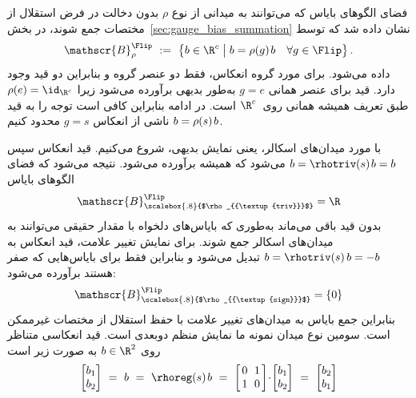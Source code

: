 فضای الگوهای بایاس که می‌توانند به میدانی از نوع $\rho$ بدون دخالت در فرض استقلال از مختصات جمع شوند، در بخش~\ref{sec:gauge_bias_summation} نشان داده شد که توسط
\begin{align}
	\mathscr{B}^{\Flip}_\rho\ :=\ \big\{ b \in\R^c \;\big|\; b = \rho(g)\mkern2mu b\ \ \ \forall g\in \Flip \big\} \,.
\end{align}
داده می‌شود.
برای مورد گروه انعکاس، فقط دو عنصر گروه و بنابراین دو قید وجود دارد.
قید برای عنصر همانی $g=e$ به‌طور بدیهی برآورده می‌شود زیرا $\rho(e) = \id_{\R^c}$ طبق تعریف همیشه همانی روی~$\R^c$ است.
در ادامه بنابراین کافی است توجه را به قید $b = \rho(s)\mkern2mu b$ ناشی از انعکاس $g=s$ محدود کنیم.

با مورد میدان‌های اسکالر، یعنی نمایش بدیهی، شروع می‌کنیم.
قید انعکاس سپس $b = \rhotriv(s)\mkern2mu b = b$ می‌شود که همیشه برآورده می‌شود.
نتیجه می‌شود که فضای الگوهای بایاس
\begin{align}
	\mathscr{B}^{\Flip}_{\scalebox{.8}{$\rho_{{\textup{triv}}}$}} = \R
\end{align}
بدون قید باقی می‌ماند به‌طوری که بایاس‌های دلخواه با مقدار حقیقی می‌توانند به میدان‌های اسکالر جمع شوند.
برای نمایش تغییر علامت، قید انعکاس به $b = \rhotriv(s)\, b = -b$ تبدیل می‌شود و بنابراین فقط برای بایاس‌هایی که صفر هستند برآورده می‌شود:
\begin{align}
	\mathscr{B}^{\Flip}_{\scalebox{.8}{$\rho_{{\textup{sign}}}$}} = \{0\}
\end{align}
بنابراین جمع بایاس به میدان‌های تغییر علامت با حفظ استقلال از مختصات غیرممکن است.
سومین نوع میدان نمونه ما نمایش منظم دوبعدی است.
قید انعکاسی متناظر روی $b\in\R^2$ به صورت زیر است
\begin{align}
	\begin{bmatrix} b_1 \\ b_2 \end{bmatrix}
	\ =\ 
	b
	\ =\ 
	\rhoreg(s)\mkern2mu b
	\ =\ 
	\begin{bmatrix} \hspace{1.5pt}
		0 &\mkern-7mu 1 \hspace*{1.5pt} \\ \hspace{1.5pt} 1 &\mkern-7mu 0 \hspace*{1.5pt}
	\end{bmatrix}
	\!\cdot\! \begin{bmatrix} b_1 \\ b_2 \end{bmatrix}
	\ =\ 
	\begin{bmatrix} b_2 \\ b_1 \end{bmatrix}
\end{align}
